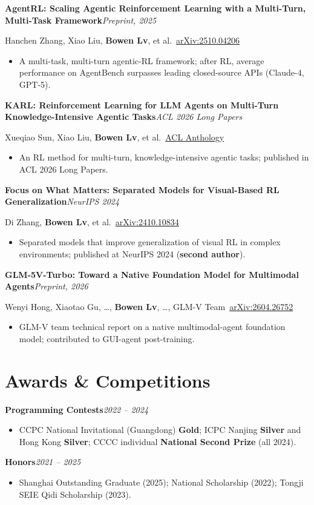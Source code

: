 \documentclass[10pt,a4paper]{article}
\newcommand{\entry}[2]{%
  \par\vspace{1pt}%
  {\sffamily\bfseries\color{inkc}#1}\hfill{\small\itshape\color{mutedc}#2}\par
  \vspace{0.5pt}}
\newcommand{\role}[1]{{\small\color{accentd}\sffamily #1}\par\vspace{1pt}}
\begin{document}
\entry{AgentRL: Scaling Agentic Reinforcement Learning with a Multi-Turn, Multi-Task Framework}{Preprint, 2025}
\role{Hanchen Zhang, Xiao Liu, \textbf{Bowen Lv}, et al.\quad\faExternalLink*~\href{https://arxiv.org/abs/2510.04206}{arXiv:2510.04206}}
\begin{itemize}
  \item A multi-task, multi-turn agentic-RL framework; after RL, average performance on AgentBench surpasses leading closed-source APIs (Claude-4, GPT-5).
\end{itemize}

\entry{KARL: Reinforcement Learning for LLM Agents on Multi-Turn Knowledge-Intensive Agentic Tasks}{ACL 2026 Long Papers}
\role{Xueqiao Sun, Xiao Liu, \textbf{Bowen Lv}, et al.\quad\faExternalLink*~\href{https://aclanthology.org/2026.acl-long.2196/}{ACL Anthology}}
\begin{itemize}
  \item An RL method for multi-turn, knowledge-intensive agentic tasks; published in ACL 2026 Long Papers.
\end{itemize}

\entry{Focus on What Matters: Separated Models for Visual-Based RL Generalization}{NeurIPS 2024}
\role{Di Zhang, \textbf{Bowen Lv}, et al.\quad\faExternalLink*~\href{https://arxiv.org/abs/2410.10834}{arXiv:2410.10834}}
\begin{itemize}
  \item Separated models that improve generalization of visual RL in complex environments; published at NeurIPS 2024 (\textbf{second author}).
\end{itemize}

\entry{GLM-5V-Turbo: Toward a Native Foundation Model for Multimodal Agents}{Preprint, 2026}
\role{Wenyi Hong, Xiaotao Gu, \ldots, \textbf{Bowen Lv}, \ldots, GLM-V Team\quad\faExternalLink*~\href{https://arxiv.org/abs/2604.26752}{arXiv:2604.26752}}
\begin{itemize}
  \item GLM-V team technical report on a native multimodal-agent foundation model; contributed to GUI-agent post-training.
\end{itemize}

\section{Awards \& Competitions}
\entry{Programming Contests}{2022 -- 2024}
\begin{itemize}
  \item CCPC National Invitational (Guangdong) \textbf{Gold}; ICPC Nanjing \textbf{Silver} and Hong Kong \textbf{Silver}; CCCC individual \textbf{National Second Prize} (all 2024).
\end{itemize}
\entry{Honors}{2021 -- 2025}
\begin{itemize}
  \item Shanghai Outstanding Graduate (2025); National Scholarship (2022); Tongji SEIE Qidi Scholarship (2023).
\end{itemize}
\end{document}
